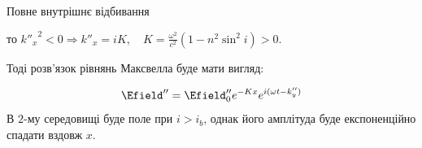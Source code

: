 \documentclass[onlytextwidth]{beamer}
\begin{document}
\begin{frame}{Повне внутрішнє відбивання}
{	то ${k''_x}^2 < 0 \Rightarrow k''_x = i K, \quad K =   \frac{\omega^2}{c^2}(1 - n^2\sin^2 i) > 0$.

	Тоді розв'язок рівнянь Максвелла буде мати вигляд:

	\[
		\Efield'' = \Efield''_0e^{-Kx} e^{i(\omega t - {k''_y})}
	\]
	\alert{В $2$-му середовищі буде поле при $i > i_b$, однак його амплітуда буде експоненційно спадати вздовж $x$}.
	}
\end{frame}
\end{document}
